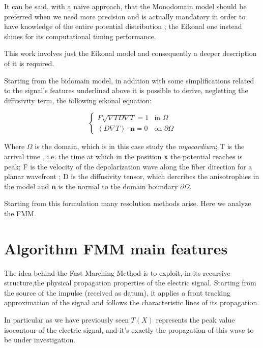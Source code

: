 \documentclass[11pt,a4paper]{article}
\begin{document}
    It can be said, with a naive approach, that the Monodomain model should be preferred when we need more precision and is actually mandatory in order to have knowledge of the entire potential distribution ; the Eikonal one instead shines for its computational timing performance. 

    This work involves just the Eikonal model and consequently a deeper description of it is required.

    Starting from the bidomain model, in addition with some simplifications related to the signal's features underlined above it is possible to derive, negletting the diffusivity term, the following eikonal equation:

    \begin{equation}
        \begin{cases}
            F\sqrt{\nabla T D \nabla T }=1 &\mbox{in } \Omega \\
            (D \nabla T) \cdot \textbf{n} = 0 & \mbox{on } \partial\Omega
        \end{cases}
    \end{equation}

    Where $\Omega$ is the domain, which is in this case study the \emph{myocardium}; T is the arrival time , i.e. the time at which in the position \textbf{x} the potential reaches is peak; F is the velocity of the depolarization wave along the fiber direction for a planar wavefront ; D is the diffusivity tensor, which dercribes the anisotrophies in the model and \textbf{n} is the normal to the domain boundary $\partial \Omega$.

    Starting from this formulation many resolution methods arise. Here we analyze the FMM.

\section{Algorithm FMM main features} \label{sec:FMM}

    The idea behind the Fast Marching Method is to exploit, in its recursive structure,the physical propagation properties of the electric signal. Starting from the source of the impulse (received as datum), it applies a front tracking approximation of the signal and follows the characteristic lines of its propagation.

    In particular as we have previously seen $T(X)$ represents the peak value isocontour of the electric signal, and it's exactly the propagation of this wave to be under investigation.
    
\end{document}
